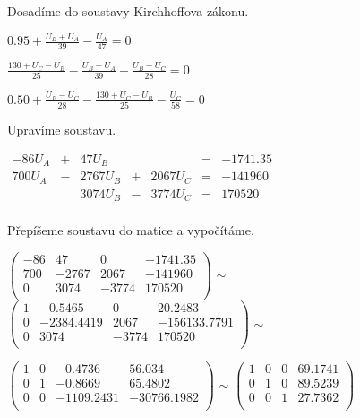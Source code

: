 \begin{large}
\vspace{1cm} \flushleft
Dosadíme do soustavy Kirchhoffova zákonu.
\end{large}

\vspace{0.5cm}
$0.95 + \frac{U_B + U_A}{39} - \frac{U_A}{47} = 0$

\vspace{0.25cm}
$\frac{130 + U_C - U_B}{25} - \frac{U_B - U_A}{39} - \frac{U_B - U_C}{28} = 0$

\vspace{0.25cm}
$0.50 + \frac{U_B - U_C}{28} - \frac{130 + U_C - U_B}{25} - \frac{U_C}{58} = 0$

\begin{large}
\vspace{1cm} \flushleft
Upravíme soustavu.
\end{large}

\vspace{0.5cm}
$
\begin{array}{ccccccc}
    -86U_A & + & 47U_B & & & = & -1741.35\\
    700U_A & - & 2767U_B & + & 2067U_C & = & -141960\\
    & & 3074U_B & - & 3774U_C & = & 170520\\
\end{array}
$

\begin{large}
\vspace{1cm} \flushleft
Přepíšeme soustavu do matice a vypočítáme.
\end{large}

\vspace{0.5cm}
$
\left(
\begin{array}{ccc|c}
-86 & 47 &0 & -1741.35\\
700 & -2767 & 2067 & -141960\\
0 & 3074 & -3774 & 170520\\
\end{array}
\right)
$
\: \: $\sim$ \: \:
$
\left(
\begin{array}{ccc|c}
1 & -0.5465 & 0 & 20.2483\\
0 & -2384.4419 & 2067 & -156133.7791\\
0 & 3074 & -3774 & 170520\\
\end{array}
\right)
$
\: \: $\sim$ \: \:

\vspace{0.5cm}
$
\left(
\begin{array}{ccc|c}
1 & 0 & -0.4736 & 56.034\\
0 & 1 & -0.8669 & 65.4802\\
0 & 0 & -1109.2431 & -30766.1982\\
\end{array}
\right)
$
\: \: $\sim$ \: \:
$
\left(
\begin{array}{ccc|c}
1 & 0 & 0 & 69.1741\\
0 & 1 & 0 & 89.5239\\
0 & 0 & 1 & 27.7362\\
\end{array}
\right)
$

